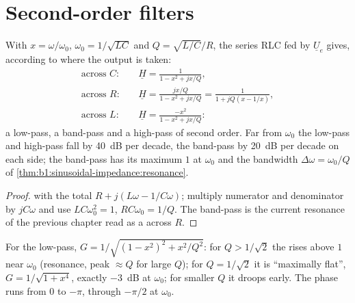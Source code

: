 \section{Second-order filters}

\begin{proposition}\label{prop:b1:filters-transfer-functions:rlc}
With $x = \omega/\omega_0$, $\omega_0 = 1/\sqrt{LC}$ and $Q =
\sqrt{L/C}/R$, the series RLC fed by $\underline U_e$ gives, according to
where the output is taken:
\begin{align*}
\text{across } C:&\quad \underline H = \frac{1}{1 - x^2 + jx/Q}, \\
\text{across } R:&\quad \underline H = \frac{jx/Q}{1 - x^2 + jx/Q} = \frac{1}{1 + jQ(x - 1/x)}, \\
\text{across } L:&\quad \underline H = \frac{-x^2}{1 - x^2 + jx/Q}:
\end{align*}
a low-pass, a band-pass and a high-pass of second order. Far from
$\omega_0$ the low-pass and high-pass fall by \qty{40}{dB} per decade,
the band-pass by \qty{20}{dB} per decade on each side; the band-pass
has its maximum $1$ at $\omega_0$ and the bandwidth $\Delta\omega =
\omega_0/Q$ of \cref{thm:b1:sinusoidal-impedance:resonance}.
\end{proposition}

\begin{proof}
 with the total  $R + j(L\omega - 1/C\omega)$;
multiply numerator and denominator by $jC\omega$ and use
$LC\omega_0^2 = 1$, $RC\omega_0 = 1/Q$. The band-pass is the current
resonance of the previous chapter read as a  across $R$.
\end{proof}

\begin{proposition}\label{prop:b1:filters-transfer-functions:lowpass2}
For the low-pass, $G = 1/\sqrt{(1 - x^2)^2 + x^2/Q^2}$: for
$Q > 1/\sqrt2$ the  rises above $1$ near $\omega_0$ (resonance, peak
$\approx Q$ for large $Q$); for $Q = 1/\sqrt2$ it is ``maximally flat'',
$G = 1/\sqrt{1 + x^4}$, exactly \qty{-3}{dB} at $\omega_0$; for smaller
$Q$ it droops early. The phase runs from $0$ to $-\pi$, through $-\pi/2$
at $\omega_0$.
\end{proposition}

